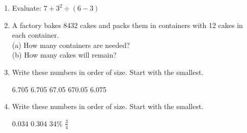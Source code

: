 \documentclass{article}
\begin{document}
\begin{enumerate}
     
 \item \quad Evaluate: \( 7 + 3^{2} \div (6 - 3 ) \) %
\vspace{10pt}
\vspace{5pt}

\item \quad A factory bakes 8432 cakes and packs them in containers with 12 cakes in each container.  \\
\quad (a) How many containers are needed? \\
\quad (b) How many cakes will remain? 
\vspace{10pt}
\vspace{5pt}


\item \quad Write these numbers in order of size. Start with the smallest. %
\begin{center}
6.705 \hspace{2cm} 6.705  \hspace{2cm} 67.05 \hspace{2cm} 670.05 \hspace{2cm} 6.075 
\end{center}


\vspace{10pt}
\vspace{5pt}

\item \quad Write these numbers in order of size. Start with the smallest. %
\begin{center}
0.034 \hspace{2cm} 0.304 \hspace{2cm} 34\% \hspace{2cm}  \( \displaystyle \frac{3}{4} \) 
\end{center}



\end{enumerate}
\end{document}
